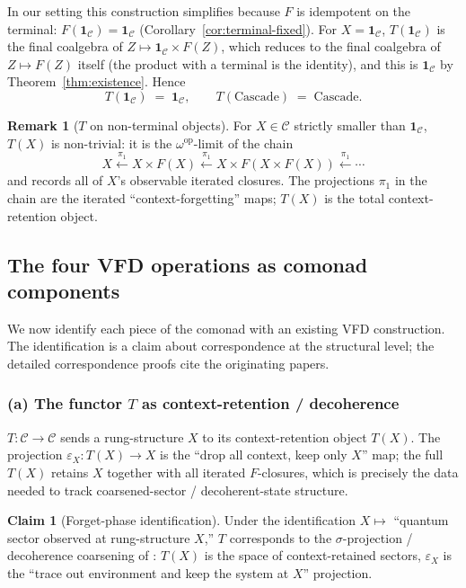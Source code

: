 \documentclass[11pt, a4paper]{amsart}
\theoremstyle{definition}
\newtheorem{remark}[theorem]{Remark}
\newtheorem{claim}[theorem]{Claim}
\newcommand{\catC}{\mathcal{C}}
\begin{document}
In our setting this construction simplifies because $F$ is
idempotent on the terminal: $F(\mathbf{1}_\catC) =
\mathbf{1}_\catC$ (Corollary~\ref{cor:terminal-fixed}). For
$X = \mathbf{1}_\catC$, $T(\mathbf{1}_\catC)$ is the final
coalgebra of $Z \mapsto \mathbf{1}_\catC \times F(Z)$, which
reduces to the final coalgebra of $Z \mapsto F(Z)$ itself (the
product with a terminal is the identity), and this is
$\mathbf{1}_\catC$ by Theorem~\ref{thm:existence}. Hence
\[
    T(\mathbf{1}_\catC) \;=\; \mathbf{1}_\catC,
    \qquad
    T(\mathrm{Cascade}) \;=\; \mathrm{Cascade}.
\]

\begin{remark}[$T$ on non-terminal objects]
\label{rmk:T-non-terminal}
For $X \in \catC$ strictly smaller than $\mathbf{1}_\catC$,
$T(X)$ is non-trivial: it is the
$\omega^{\mathrm{op}}$-limit of the chain
\[
    X \xleftarrow{\pi_1} X \times F(X) \xleftarrow{\pi_1}
    X \times F(X \times F(X)) \xleftarrow{\pi_1} \cdots
\]
and records all of $X$'s observable iterated closures. The
projections $\pi_1$ in the chain are the iterated
``context-forgetting'' maps; $T(X)$ is the total
context-retention object.
\end{remark}

\subsection{The four VFD operations as comonad components}
\label{subsec:four-phase-id}

We now identify each piece of the comonad with an existing VFD
construction. The identification is a claim about correspondence
at the structural level; the detailed correspondence proofs
cite the originating papers.

\subsubsection*{(a) The functor $T$ as context-retention /
  decoherence}

$T \colon \catC \to \catC$ sends a rung-structure $X$ to its
context-retention object $T(X)$. The projection $\varepsilon_X
\colon T(X) \to X$ is the ``drop all context, keep only $X$''
map; the full $T(X)$ retains $X$ together with all iterated
$F$-closures, which is precisely the data needed to track
coarsened-sector / decoherent-state structure.

\begin{claim}[Forget-phase identification]
\label{claim:T-decoherence}
Under the identification $X \mapsto $ ``quantum sector observed
at rung-structure $X$,'' $T$ corresponds to the
$\sigma$-projection / decoherence coarsening of
\cite{PaperXXXI, PaperXLIV}: $T(X)$ is the space of
context-retained sectors, $\varepsilon_X$ is the ``trace out
environment and keep the system at $X$'' projection.
\end{claim}
\end{document}
